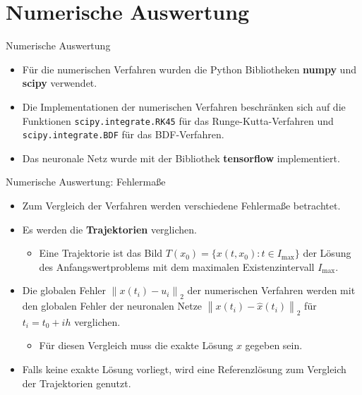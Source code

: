 \section{Numerische Auswertung}

\begin{frame}{Numerische Auswertung}
    \begin{itemize}
        \item<1-> Für die numerischen Verfahren wurden die Python Bibliotheken \textbf{numpy} und \textbf{scipy} verwendet.
        \item<2-> Die Implementationen der numerischen Verfahren beschränken sich auf die Funktionen
        \texttt{scipy.integrate.RK45} für das Runge-Kutta-Verfahren und \texttt{scipy.integrate.BDF} für das BDF-Verfahren.
        \item<3-> Das neuronale Netz wurde mit der Bibliothek \textbf{tensorflow} implementiert.
    \end{itemize}
\end{frame}

\begin{frame}{Numerische Auswertung: Fehlermaße}
    \begin{itemize}
        \item<1-> Zum Vergleich der Verfahren werden verschiedene Fehlermaße betrachtet.
        \item<2-> Es werden die \textbf{Trajektorien} verglichen.
        \begin{itemize}
            \item<1-> Eine Trajektorie ist das Bild $T(x_0)=\{x(t,x_0):t\in I_{\text{max}} \}$ der Lösung des
            Anfangswertproblems mit dem maximalen Existenzintervall $I_{\text{max}}$.
        \end{itemize}
        \item<3-> Die globalen Fehler $\left\lVert x(t_i) - u_i \right\rVert_2$ der numerischen Verfahren werden mit den
        globalen Fehler der neuronalen Netze $\left\lVert x(t_i) - \hat{x}(t_i) \right\rVert_2$ für $t_i=t_0+ih$ verglichen.
        \begin{itemize}
            \item<1-> Für diesen Vergleich muss die exakte Lösung $x$ gegeben sein.
        \end{itemize}
        \item<4-> Falls keine exakte Lösung vorliegt, wird eine Referenzlösung zum Vergleich der Trajektorien genutzt.
    \end{itemize}
\end{frame}

